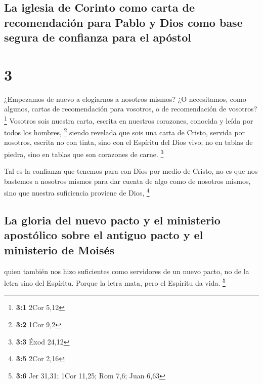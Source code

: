 \hypertarget{la-iglesia-de-corinto-como-carta-de-recomendaciuxf3n-para-pablo-y-dios-como-base-segura-de-confianza-para-el-apuxf3stol}{%
\subsection{La iglesia de Corinto como carta de recomendación para Pablo
y Dios como base segura de confianza para el
apóstol}\label{la-iglesia-de-corinto-como-carta-de-recomendaciuxf3n-para-pablo-y-dios-como-base-segura-de-confianza-para-el-apuxf3stol}}

\hypertarget{section-2}{%
\section{3}\label{section-2}}

 ¿Empezamos de nuevo a elogiarnos a nosotros mismos? ¿O
necesitamos, como algunos, cartas de recomendación para vosotros, o de
recomendación de vosotros? \footnote{\textbf{3:1} 2Cor 5,12}
 Vosotros sois nuestra carta, escrita en nuestros
corazones, conocida y leída por todos los hombres, \footnote{\textbf{3:2}
  1Cor 9,2}  siendo revelada que sois una carta de Cristo,
servida por nosotros, escrita no con tinta, sino con el Espíritu del
Dios vivo; no en tablas de piedra, sino en tablas que son corazones de
carne. \footnote{\textbf{3:3} Éxod 24,12}

 Tal es la confianza que tenemos para con Dios por medio
de Cristo,  no es que nos bastemos a nosotros mismos para
dar cuenta de algo como de nosotros mismos, sino que nuestra suficiencia
proviene de Dios, \footnote{\textbf{3:5} 2Cor 2,16}

\hypertarget{la-gloria-del-nuevo-pacto-y-el-ministerio-apostuxf3lico-sobre-el-antiguo-pacto-y-el-ministerio-de-moisuxe9s}{%
\subsection{La gloria del nuevo pacto y el ministerio apostólico sobre
el antiguo pacto y el ministerio de
Moisés}\label{la-gloria-del-nuevo-pacto-y-el-ministerio-apostuxf3lico-sobre-el-antiguo-pacto-y-el-ministerio-de-moisuxe9s}}

 quien también nos hizo suficientes como servidores de un
nuevo pacto, no de la letra sino del Espíritu. Porque la letra mata,
pero el Espíritu da vida. \footnote{\textbf{3:6} Jer 31,31; 1Cor 11,25;
  Rom 7,6; Juan 6,63}

